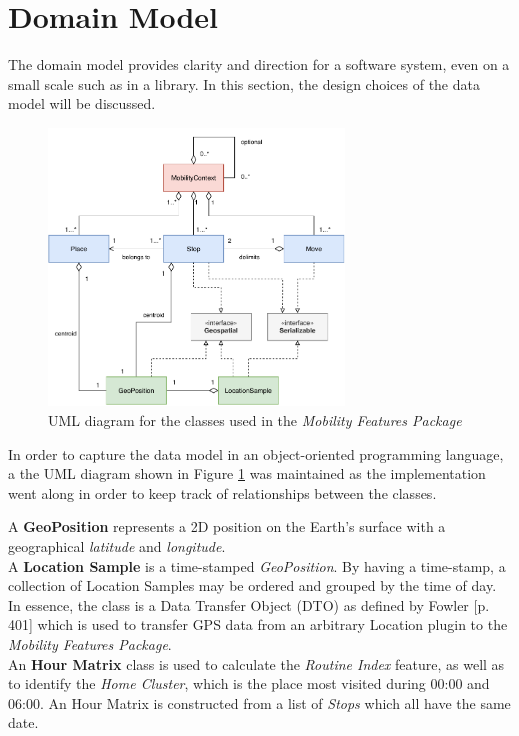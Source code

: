 \section{Domain Model}
The domain model provides clarity and direction for a software system, even on a small scale such as in a library. In this section, the design choices of the data model will be discussed.

\begin{figure}[h]
    \centering
    \includegraphics[width=0.7\textwidth]{images/diagrams/data-model-diagram.pdf}
    \caption{UML diagram for the classes used in the \textit{Mobility Features Package}}
    \label{fig:uml-diagram}
\end{figure}

In order to capture the data model in an object-oriented programming language, a the UML diagram shown in Figure \ref{fig:uml-diagram} was maintained as the implementation went along in order to keep track of relationships between the classes. 

A \textbf{GeoPosition} represents a 2D position on the Earth's surface with a geographical \textit{latitude} and \textit{longitude}.\\

A \textbf{Location Sample} is a time-stamped \textit{GeoPosition}. By having a time-stamp, a collection of Location Samples may be ordered and grouped by the time of day. In essence, the class is a Data Transfer Object (DTO) as defined by Fowler \cite{fowler-PEEA} [p. 401] which is used to transfer GPS data from an arbitrary Location plugin to the \textit{Mobility Features Package}.\\

An \textbf{Hour Matrix} class is used to calculate the \textit{Routine Index} feature, as well as to identify the \textit{Home Cluster}, which is the place most visited during 00:00 and 06:00. An Hour Matrix is constructed from a list of \textit{Stops} which all have the same date.\\

